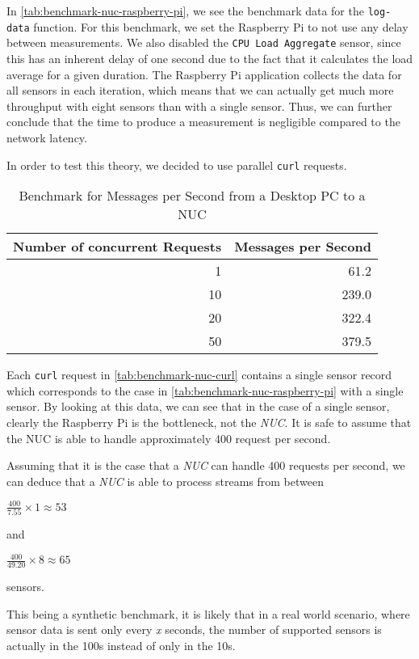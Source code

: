 In \autoref{tab:benchmark-nuc-raspberry-pi}, we see the benchmark data for the \texttt{log-data}
function. For this benchmark, we set the Raspberry Pi to not use any delay between measurements. We
also disabled the \texttt{CPU Load Aggregate} sensor, since this has an inherent delay of one second
due to the fact that it calculates the load average for a given duration. The Raspberry Pi
application collects the data for all sensors in each iteration, which means that we can actually
get much more throughput with eight sensors than with a single sensor. Thus, we can further conclude
that the time to produce a measurement is negligible compared to the network latency.

In order to test this theory, we decided to use parallel \texttt{curl} requests.

\begin{table}[H]
  \centering
  \begin{tabular}{|r|r|}
    \hline
    Number of concurrent Requests & Messages per Second \\ \hline
                                1 &                61.2 \\ \hline
                               10 &               239.0 \\ \hline
                               20 &               322.4 \\ \hline
                               50 &               379.5 \\ \hline
  \end{tabular}
  \caption{Benchmark for Messages per Second from a Desktop PC to a NUC}
  \label{tab:benchmark-nuc-curl}
\end{table}

Each \texttt{curl} request in \autoref{tab:benchmark-nuc-curl} contains a single sensor record which
corresponds to the case in \autoref{tab:benchmark-nuc-raspberry-pi} with a single sensor. By looking
at this data, we can see that in the case of a single sensor, clearly the Raspberry Pi is the
bottleneck, not the \textit{NUC}. It is safe to assume that the NUC is able to handle approximately
400 request per second.

Assuming that it is the case that a \textit{NUC} can handle 400 requests per second, we can deduce
that a \textit{NUC} is able to process streams from between

$\frac{400}{7.55} \times 1 \approx 53$

and

$\frac{400}{49.20} \times 8 \approx 65$

sensors.

This being a synthetic benchmark, it is likely that in a real world scenario, where sensor data is
sent only every \textit{x} seconds, the number of supported sensors is actually in the 100s instead
of only in the 10s.
